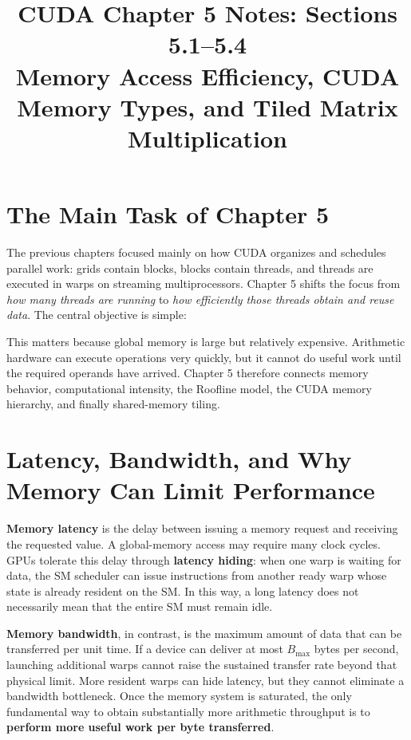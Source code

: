 \documentclass[11pt,a4paper]{article}
\title{CUDA Chapter 5 Notes: Sections 5.1--5.4\\
Memory Access Efficiency, CUDA Memory Types, and Tiled Matrix Multiplication}
\author{}
\date{}
\begin{document}
\maketitle

\section{The Main Task of Chapter 5}

The previous chapters focused mainly on how CUDA organizes and schedules parallel work: grids contain blocks, blocks contain threads, and threads are executed in warps on streaming multiprocessors. Chapter 5 shifts the focus from \emph{how many threads are running} to \emph{how efficiently those threads obtain and reuse data}. The central objective is simple:

\begin{center}
\end{center}

This matters because global memory is large but relatively expensive. Arithmetic hardware can execute operations very quickly, but it cannot do useful work until the required operands have arrived. Chapter 5 therefore connects memory behavior, computational intensity, the Roofline model, the CUDA memory hierarchy, and finally shared-memory tiling.

\section{Latency, Bandwidth, and Why Memory Can Limit Performance}

\textbf{Memory latency} is the delay between issuing a memory request and receiving the requested value. A global-memory access may require many clock cycles. GPUs tolerate this delay through \textbf{latency hiding}: when one warp is waiting for data, the SM scheduler can issue instructions from another ready warp whose state is already resident on the SM. In this way, a long latency does not necessarily mean that the entire SM must remain idle.

\textbf{Memory bandwidth}, in contrast, is the maximum amount of data that can be transferred per unit time. If a device can deliver at most $B_{\max}$ bytes per second, launching additional warps cannot raise the sustained transfer rate beyond that physical limit. More resident warps can hide latency, but they cannot eliminate a bandwidth bottleneck. Once the memory system is saturated, the only fundamental way to obtain substantially more arithmetic throughput is to \textbf{perform more useful work per byte transferred}.
\end{document}

